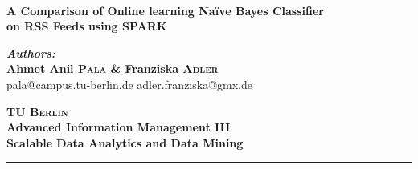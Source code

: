 \documentclass[a0,portrait]{a0poster}
\begin{document}
\pagecolor[rgb]{0.9,0.925,0.9}
 \begin{center}
    {\huge \textbf{\\A Comparison of Online learning Na\"ive Bayes Classifier\\ on RSS Feeds using SPARK\\}}
  \end{center}
\begin{minipage}{0.4\textwidth}
\begin{flushleft} \large
\textbf{\emph{Authors:}\\
Ahmet Anil \textsc{Pala} \& Franziska \textsc{Adler}}\\
pala@campus.tu-berlin.de\hspace{0.5cm} adler.franziska@gmx.de
\end{flushleft}
\end{minipage}
\hfill
\begin{minipage}{0.4\textwidth}
\begin{flushright} \large
\textbf{\textsc{\color{darkred} \Large TU Berlin}\\
Advanced Information Management III\\
Scalable Data Analytics and Data Mining}
\end{flushright}
\end{minipage}
\newcommand{\HRule}{\rule[-10mm]{805mm}{1mm}} \HRule \\[0.5cm] %


\vspace{0.8cm}
\hspace{0.8cm}
\hspace{0.8cm}


\vspace{0.8cm}
\vspace{0.8cm}
\end{document}
